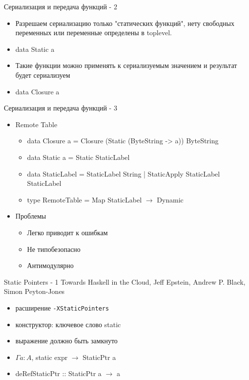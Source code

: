 \documentclass{beamer}
\begin{document}
\begin{frame}{Сериализация и передача функций - 2}
  \begin{itemize}
    \item Разрешаем сериализацию только "статических функций", нету свободных переменных
            или переменные определены в toplevel.
    \item data Static a
    \item Такие функции можно применять к сериализуемым значением и результат будет сериализуем
    \item data Closure a
\end{itemize}
\end{frame}

\begin{frame}{Сериализация и передача функций - 3}
  \begin{itemize}
    \item Remote Table
      \begin{itemize}
        \item data Closure a = Closure (Static (ByteString -> a)) ByteString
        \item data Static a = Static StaticLabel
        \item data StaticLabel = StaticLabel String | StaticApply StaticLabel StaticLabel
        \item type RemoteTable = Map StaticLabel $\rightarrow$ Dynamic
      \end{itemize}
    \item Проблемы
      \begin{itemize}
        \item Легко приводит к ошибкам
        \item Не типобезопасно
        \item Антимодулярно
      \end{itemize}
  \end{itemize}
\end{frame}

\begin{frame}{Static Pointers - 1}
  {\newblock Towards Haskell in the Cloud, Jeff Epstein, Andrew P. Black, Simon Peyton-Jones}
  \begin{itemize}
    \item расширение \texttt{-XStaticPointers}
    \item конструктор: ключевое слово \alert{static}
    \item выражение должно быть замкнуто
    \item $\Gamma a : A$, static expr $\rightarrow$ StaticPtr a
    \item deRefStaticPtr :: StaticPtr a $\rightarrow$ a
  \end{itemize}
\end{frame}
\end{document}
